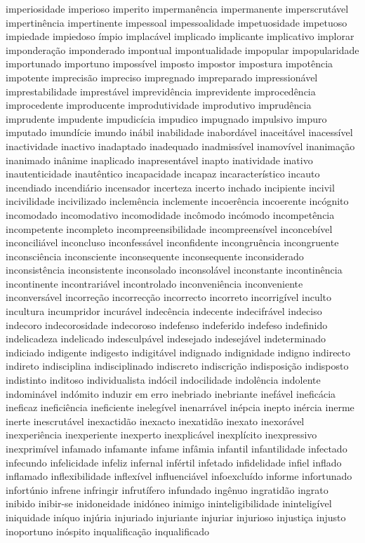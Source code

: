 \documentclass[ruledheader]{abnt_UFF}
\begin{document}
imperiosidade imperioso imperito imperman\^{e}ncia impermanente imperscrut\'{a}vel impertin\^{e}ncia impertinente impessoal impessoalidade impetuosidade impetuoso impiedade impiedoso \'{i}mpio implac\'{a}vel implicado implicante implicativo implorar impondera\c{c}\~ao imponderado impontual impontualidade impopular impopularidade importunado importuno imposs\'{i}vel imposto impostor impostura impot\^{e}ncia impotente imprecis\~ao impreciso impregnado impreparado impression\'{a}vel imprestabilidade imprest\'{a}vel imprevid\^{e}ncia imprevidente improced\^{e}ncia improcedente improducente improdutividade improdutivo imprud\^{e}ncia imprudente impudente impudic\'{i}cia impudico impugnado impulsivo impuro imputado imund\'{i}cie imundo in\'{a}bil inabilidade inabord\'{a}vel inaceit\'{a}vel inacess\'{i}vel inactividade inactivo inadaptado inadequado inadmiss\'{i}vel inamov\'{i}vel inanima\c{c}\~ao inanimado in\^{a}nime inaplicado inapresent\'{a}vel inapto inatividade inativo inautenticidade inaut\^{e}ntico incapacidade incapaz incaracter\'{i}stico incauto incendiado incendi\'{a}rio incensador incerteza incerto inchado incipiente incivil incivilidade incivilizado inclem\^{e}ncia inclemente incoer\^{e}ncia incoerente inc\'{o}gnito incomodado incomodativo incomodidade inc\^{o}modo inc\'{o}modo incompet\^{e}ncia incompetente incompleto incompreensibilidade incompreens\'{i}vel inconceb\'{i}vel inconcili\'{a}vel inconcluso inconfess\'{a}vel inconfidente incongru\^{e}ncia incongruente inconsci\^{e}ncia inconsciente inconsequente inconsequente inconsiderado inconsist\^{e}ncia inconsistente inconsolado inconsol\'{a}vel inconstante incontin\^{e}ncia incontinente incontrari\'{a}vel incontrolado inconveni\^{e}ncia inconveniente inconvers\'{a}vel incorre\c{c}\~ao incorrec\c{c}\~ao incorrecto incorreto incorrig\'{i}vel inculto incultura incumpridor incur\'{a}vel indec\^{e}ncia indecente indecifr\'{a}vel indeciso indecoro indecorosidade indecoroso indefenso indeferido indefeso indefinido indelicadeza indelicado indesculp\'{a}vel indesejado indesej\'{a}vel indeterminado indiciado indigente indigesto indigit\'{a}vel indignado indignidade indigno indirecto indireto indisciplina indisciplinado indiscreto indiscri\c{c}\~ao indisposi\c{c}\~ao indisposto indistinto inditoso individualista ind\'{o}cil indocilidade indol\^{e}ncia indolente indomin\'{a}vel ind\'{o}mito induzir em erro inebriado inebriante inef\'{a}vel inefic\'{a}cia ineficaz inefici\^{e}ncia ineficiente ineleg\'{i}vel inenarr\'{a}vel in\'{e}pcia inepto in\'{e}rcia inerme inerte inescrut\'{a}vel inexactid\~ao inexacto inexatid\~ao inexato inexor\'{a}vel inexperi\^{e}ncia inexperiente inexperto inexplic\'{a}vel inexpl\'{i}cito inexpressivo inexprim\'{i}vel infamado infamante infame inf\^{a}mia infantil infantilidade infectado infecundo infelicidade infeliz infernal inf\'{e}rtil infetado infidelidade infiel inflado inflamado inflexibilidade inflex\'{i}vel influenci\'{a}vel infoexclu\'{i}do informe infortunado infort\'{u}nio infrene infringir infrut\'{i}fero infundado ing\^{e}nuo ingratid\~ao ingrato inibido inibir-se inidoneidade inid\'{o}neo inimigo ininteligibilidade inintelig\'{i}vel iniquidade in\'{i}quo inj\'{u}ria injuriado injuriante injuriar injurioso injusti\c{c}a injusto inoportuno in\'{o}spito inqualifica\c{c}\~ao inqualificado 
\end{document}
